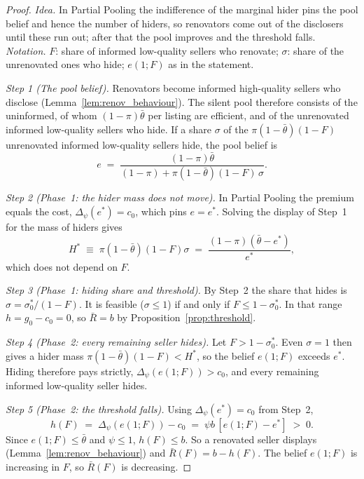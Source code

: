 \begin{proof}\upshape
\emph{Idea.} In Partial Pooling the indifference of the marginal hider pins the pool belief and hence the number of hiders, so renovators come out of the disclosers until these run out; after that the pool improves and the threshold falls. \emph{Notation.} $F$: share of informed low-quality sellers who renovate; $\sigma$: share of the unrenovated ones who hide; $e(1;F)$ as in the statement.

\emph{Step 1 (The pool belief).} Renovators become informed high-quality sellers who disclose (Lemma~\ref{lem:renov_behaviour}). The silent pool therefore consists of the uninformed, of whom $(1-\pi)\bar\theta$ per listing are efficient, and of the unrenovated informed low-quality sellers who hide. If a share $\sigma$ of the $\pi(1-\bar\theta)(1-F)$ unrenovated informed low-quality sellers hide, the pool belief is
\begin{equation*}
    e\;=\;\frac{(1-\pi)\bar\theta}{(1-\pi)+\pi(1-\bar\theta)(1-F)\,\sigma}.
\end{equation*}

\emph{Step 2 (Phase~1: the hider mass does not move).} In Partial Pooling the premium equals the cost, $\Delta_\psi(e^*)=c_0$, which pins $e=e^*$. Solving the display of Step~1 for the mass of hiders gives
\begin{equation*}
    H^*\;\equiv\;\pi(1-\bar\theta)(1-F)\sigma\;=\;\frac{(1-\pi)(\bar\theta-e^*)}{e^*},
\end{equation*}
which does not depend on $F$.

\emph{Step 3 (Phase~1: hiding share and threshold).} By Step~2 the share that hides is $\sigma=\sigma_0^*/(1-F)$. It is feasible ($\sigma\le1$) if and only if $F\le1-\sigma_0^*$. In that range $h=g_0-c_0=0$, so $\bar R=b$ by Proposition~\ref{prop:threshold}.

\emph{Step 4 (Phase~2: every remaining seller hides).} Let $F>1-\sigma_0^*$. Even $\sigma=1$ then gives a hider mass $\pi(1-\bar\theta)(1-F)<H^*$, so the belief $e(1;F)$ exceeds $e^*$. Hiding therefore pays strictly, $\Delta_\psi(e(1;F))>c_0$, and every remaining informed low-quality seller hides.

\emph{Step 5 (Phase~2: the threshold falls).} Using $\Delta_\psi(e^*)=c_0$ from Step~2,
\begin{equation*}
    h(F)\;=\;\Delta_\psi(e(1;F))-c_0\;=\;\psi b\,[e(1;F)-e^*]\;>\;0.
\end{equation*}
Since $e(1;F)\le\bar\theta$ and $\psi\le1$, $h(F)\le b$. So a renovated seller displays (Lemma~\ref{lem:renov_behaviour}) and $\bar R(F)=b-h(F)$. The belief $e(1;F)$ is increasing in $F$, so $\bar R(F)$ is decreasing.


\end{proof}
